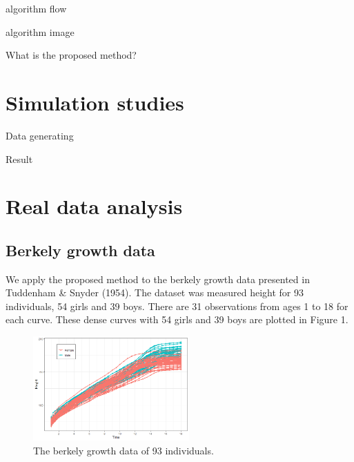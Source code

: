 \documentclass[eng]{csam}
\begin{document}
{\color{red}
	algorithm flow
	
	algorithm image
	
	What is the proposed method?
}




\section{Simulation studies}
{\color{red}
	Data generating
	
	Result
}




\section{Real data analysis}
\subsection{Berkely growth data}
We apply the proposed method to the berkely growth data presented in Tuddenham \& Snyder (1954). 
The dataset was measured height for 93 individuals, 54 girls and 39 boys. There are 31 observations from ages 1 to 18 for each curve.
These dense curves with 54 girls and 39 boys are plotted in Figure 1.

\begin{figure}[h]
	\centering
	\includegraphics[height=4cm,keepaspectratio=true]{img/growth.png}
	\caption{The berkely growth data of 93 individuals.}
	\label{fig:rsxb}
\end{figure}
\end{document}
